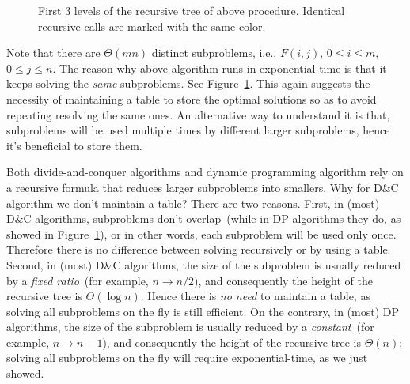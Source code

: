 \begin{figure}[b]
\centering{}
\caption{First 3 levels of the recursive tree of above procedure.
Identical recursive calls are marked with the same color.}
\label{fig:search-tree}
\end{figure}


Note that there are $\Theta(mn)$ distinct subproblems, i.e., $F(i,j)$, $0\le i
\le m$, $0\le j \le n$. The reason why above
algorithm runs in exponential time is that it keeps solving the \emph{same}
subproblems. See Figure~\ref{fig:search-tree}. This again suggests the necessity
of maintaining a table to store the optimal solutions so as to avoid
repeating resolving the same ones.
An alternative way to understand it is that, subproblems will be used
multiple times by different larger subproblems, hence it's beneficial
to store them.


Both divide-and-conquer algorithms and dynamic programming algorithm
rely on a recursive formula that reduces larger subproblems into smallers.
Why for D\&C algorithm we don't maintain a table?
There are two reasons.
First, in (most) D\&C algorithms, subproblems don't overlap~(while in DP algorithms they do, as showed in Figure~\ref{fig:search-tree}), or in other words,
each subproblem will be used only once. Therefore there is no difference between
solving recursively or by using a table.
Second, in (most) D\&C algorithms, the size of the subproblem is usually reduced by a \emph{fixed ratio}~(for example, $n\to n/2$),
and consequently the height of the recursive tree is $\Theta(\log n)$. 
Hence there is \emph{no need} to maintain a table, as solving all subproblems on the fly is still efficient.
On the contrary, in (most) DP algorithms, the size of the subproblem is usually reduced by a \emph{constant}~(for example, $n\to n-1$),
and consequently the height of the recursive tree is $\Theta(n)$;
solving all subproblems on the fly will require exponential-time, as we just showed.

